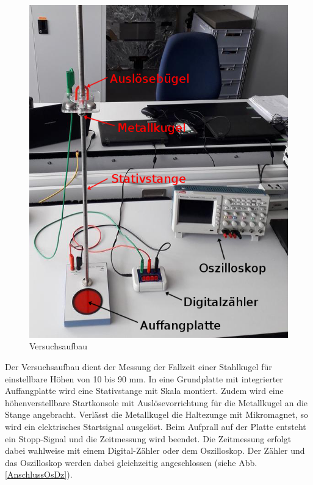 \documentclass[a4paper, 12pt]{scrartcl}
\begin{document}
\begin{figure}[h]
	\centering
	\includegraphics{bilder/Aufbau_fF_be.jpg}
	\caption{Versuchsaufbau}
\end{figure}
Der Versuchsaufbau dient der Messung der Fallzeit einer Stahlkugel für einstellbare Höhen von 10 bis 90 mm. In eine Grundplatte mit integrierter Auffangplatte wird eine Stativstange mit Skala montiert. Zudem wird eine höhenverstellbare Startkonsole mit Auslösevorrichtung für die Metallkugel an die Stange angebracht. Verlässt die Metallkugel die Haltezunge mit Mikromagnet, so wird ein elektrisches Startsignal ausgelöst. Beim Aufprall auf der Platte entsteht ein Stopp-Signal und die Zeitmessung wird beendet. Die Zeitmessung erfolgt dabei wahlweise mit einem Digital-Zähler oder dem Oszilloskop. Der Zähler und das Oszilloskop werden dabei gleichzeitig angeschlossen (siehe Abb. \ref{AnschlussOsDz}).
\end{document}
